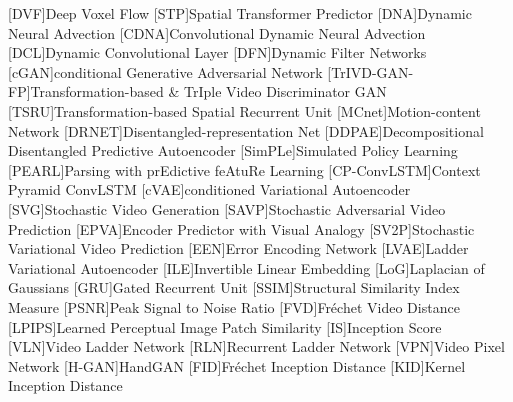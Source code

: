 \begin{acronym}
    [DVF]{Deep Voxel Flow}
    [STP]{Spatial Transformer Predictor}
    [DNA]{Dynamic Neural Advection}
    [CDNA]{Convolutional Dynamic Neural Advection}
    [DCL]{Dynamic Convolutional Layer}
    [DFN]{Dynamic Filter Networks}
    [cGAN]{conditional Generative Adversarial Network}
    [TrIVD-GAN-FP]{Transformation-based \& TrIple Video Discriminator GAN}
    [TSRU]{Transformation-based Spatial Recurrent Unit}
    [MCnet]{Motion-content Network}
    [DRNET]{Disentangled-representation Net}
    [DDPAE]{Decompositional Disentangled Predictive Autoencoder}
    [SimPLe]{Simulated Policy Learning}
    [PEARL]{Parsing with prEdictive feAtuRe Learning}
    [CP-ConvLSTM]{Context Pyramid ConvLSTM}
    [cVAE]{conditioned Variational Autoencoder}
    [SVG]{Stochastic Video Generation}
    [SAVP]{Stochastic Adversarial Video Prediction}
    [EPVA]{Encoder Predictor with Visual Analogy}
    [SV2P]{Stochastic Variational Video Prediction}
    [EEN]{Error Encoding Network}
    [LVAE]{Ladder Variational Autoencoder}
    [ILE]{Invertible Linear Embedding}
    [LoG]{Laplacian of Gaussians}
    [GRU]{Gated Recurrent Unit}
    [SSIM]{Structural Similarity Index Measure}
    [PSNR]{Peak Signal to Noise Ratio}
    [FVD]{Fréchet Video Distance}
    [LPIPS]{Learned Perceptual Image Patch Similarity}
    [IS]{Inception Score}
    [VLN]{Video Ladder Network}
    [RLN]{Recurrent Ladder Network}
    [VPN]{Video Pixel Network}
    [H-GAN]{HandGAN}
    [FID]{Fréchet Inception Distance}
    [KID]{Kernel Inception Distance}
\end{acronym}
